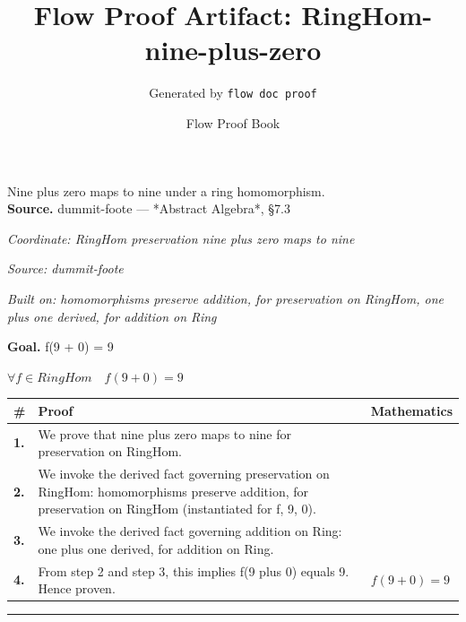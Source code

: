 \documentclass[11pt]{article}
\title{Flow Proof Artifact: RingHom-nine-plus-zero}
\author{Generated by \texttt{flow doc proof}}
\date{Flow Proof Book}
\theoremstyle{definition}
\begin{document}
\maketitle
Nine plus zero maps to nine under a ring homomorphism.\\[0.5em]
\textbf{Source.} dummit-foote — *Abstract Algebra*, §7.3\\[0.5em]
\bigskip
{}\par
\smallskip\noindent\textit{Coordinate: RingHom \cdot preservation \cdot nine plus zero maps to nine}\par
\smallskip\noindent\textit{Source: dummit-foote}\par
\smallskip\noindent\textit{Built on: homomorphisms preserve addition, for preservation on RingHom, one plus one derived, for addition on Ring}\par
\medskip
\noindent\textbf{Goal.} f(9 + 0) = 9\par
\noindent$\displaystyle \forall f \in RingHom\quad f(9 + 0) = 9$\par
\medskip
\noindent
\begin{tabular}{@{} >{\raggedright\arraybackslash}p{} >{\raggedright\arraybackslash}p{} >{\raggedleft\arraybackslash}p{} @{}}
\textbf{\#} & \textbf{Proof} & \textbf{Mathematics} \\
\midrule
\textbf{1.} & We prove that nine plus zero maps to nine for preservation on RingHom. & \\[0.45em]
\textbf{2.} & We invoke the derived fact governing preservation on RingHom: homomorphisms preserve addition, for preservation on RingHom (instantiated for f, 9, 0). & \\[0.45em]
\textbf{3.} & We invoke the derived fact governing addition on Ring: one plus one derived, for addition on Ring. & \\[0.45em]
\textbf{4.} & From step 2 and step 3, this implies f(9 plus 0) equals 9. Hence proven. & $\displaystyle f(9 + 0) = 9$ \\[0.45em]
\bottomrule
\end{tabular}
\label{thm:RingHom-preservation-nine_plus_zero_maps_to_nine}
\par\medskip\hrule
\end{document}
